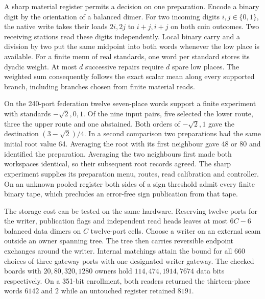 \documentclass[11pt]{article}
\theoremstyle{remark}
\theoremstyle{plain}
\begin{document}
A sharp material register permits a decision on one preparation. Encode
a binary digit by the orientation of a balanced dimer. For two incoming
digits \(i,j\in\{0,1\}\), the native write takes their loads \(2i,2j\)
to \(i+j,i+j\) on both coin outcomes. Two receiving stations read these
digits independently. Local binary carry and a division by two put the
same midpoint into both words whenever the low place is available. For a
finite menu of real standards, one word per standard stores its dyadic
weight. At most \(d\) successive repairs require \(d\) spare low places.
The weighted sum consequently follows the exact scalar mean along every
supported branch, including branches chosen from finite material reads.

On the 240-port federation twelve seven-place words support a finite
experiment with standards \(-\sqrt{2},0,1\). Of the nine input pairs,
five selected the lower route, three the upper route and one abstained.
Both orders of \(-\sqrt{2},1\) gave the destination \((3-\sqrt{2})/4\).
In a second comparison two preparations had the same initial root value
64. Averaging the root with its first neighbour gave 48 or 80 and
identified the preparation. Averaging the two neighbours first made
both workspaces identical, so their subsequent root records agreed.
The sharp experiment supplies its preparation menu, routes, read
calibration and controller. On an unknown pooled register both sides of
a sign threshold admit every finite binary tape, which precludes an
error-free sign publication from that tape.

The storage cost can be tested on the same hardware. Reserving twelve
ports for the writer, publication flags and independent read heads
leaves at most $6C-6$ balanced data dimers on $C$ twelve-port cells.
Choose a writer on an external seam outside an owner spanning tree.
The tree then carries reversible endpoint exchanges around the writer.
Internal matchings attain the bound for all 660 choices of three gateway
ports with one designated writer gateway. The checked boards with
$20,80,320,1280$ owners hold $114,474,1914,7674$ data bits respectively.
On a 351-bit enrollment, both readers returned the thirteen-place
words $6142$ and $2$ while an untouched register retained $8191$.
\end{document}
